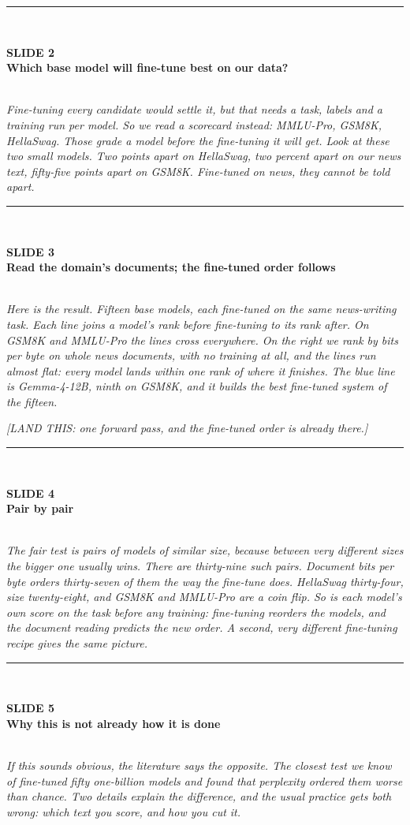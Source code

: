 \documentclass[11pt,a4paper]{article}
\newcommand{\slide}[3]{%
  \vspace{1.0em}%
  {\color{rule}\rule{\textwidth}{0.6pt}}\\[0.35em]%
  \begin{minipage}[t]{0.78\textwidth}%
    {\color{accent}\footnotesize\bfseries SLIDE #1}\\[0.15em]%
    {\large\bfseries #2}%
  \end{minipage}\hfill%
  \begin{minipage}[t]{0.20\textwidth}%
    \raggedleft{\footnotesize\color{mute}#3}%
  \end{minipage}\\[0.5em]%
}
\newcommand{\cue}[1]{{\color{warm}\small\textit{[#1]}}\par}
\newenvironment{say}{\itshape}{\par}
\begin{document}
\slide{2}{Which base model will fine-tune best on our data?}{0:15--1:00}
\begin{say}
Fine-tuning every candidate would settle it, but that needs a task, labels and a training run per
model. So we read a scorecard instead: MMLU-Pro, GSM8K, HellaSwag. Those grade a model before the
fine-tuning it will get. Look at these two small models. Two points apart on HellaSwag, two percent
apart on our news text, fifty-five points apart on GSM8K. Fine-tuned on news, they cannot be told
apart.
\end{say}

\slide{3}{Read the domain's documents; the fine-tuned order follows}{1:00--1:55}
\begin{say}
Here is the result. Fifteen base models, each fine-tuned on the same news-writing task. Each line
joins a model's rank before fine-tuning to its rank after. On GSM8K and MMLU-Pro the lines cross
everywhere. On the right we rank by bits per byte on whole news documents, with no training at
all, and the lines run almost flat: every model lands within one rank of where it finishes. The
blue line is Gemma-4-12B, ninth on GSM8K, and it builds the best fine-tuned system of the fifteen.
\end{say}
\cue{LAND THIS: one forward pass, and the fine-tuned order is already there.}

\slide{4}{Pair by pair}{1:55--2:40}
\begin{say}
The fair test is pairs of models of similar size, because between very different sizes the bigger
one usually wins. There are thirty-nine such pairs. Document bits per byte orders thirty-seven of
them the way the fine-tune does. HellaSwag thirty-four, size twenty-eight, and GSM8K and MMLU-Pro
are a coin flip. So is each model's own score on the task before any training: fine-tuning
reorders the models, and the document reading predicts the new order. A second, very different fine-tuning recipe gives the same picture.
\end{say}

\slide{5}{Why this is not already how it is done}{2:40--3:25}
\begin{say}
If this sounds obvious, the literature says the opposite. The closest test we know of fine-tuned
fifty one-billion models and found that perplexity ordered them worse than chance. Two details
explain the difference, and the usual practice gets both wrong: which text you score, and how you
cut it.
\end{say}
\end{document}
